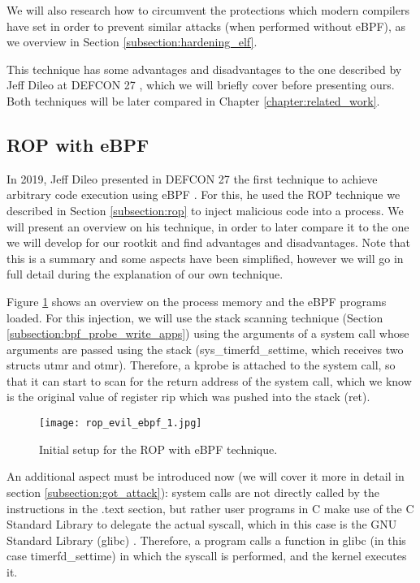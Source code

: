 We will also research how to circumvent the protections which modern compilers have set in order to prevent similar attacks (when performed without eBPF), as we overview in Section \ref{subsection:hardening_elf}.

This technique has some advantages and disadvantages to the one described by Jeff Dileo at DEFCON 27 \cite{evil_ebpf_p6974}, which we will briefly cover before presenting ours. Both techniques will be later compared in Chapter \ref{chapter:related_work}.


\subsection{ROP with eBPF} \label{subsection:rop_ebpf}
In 2019, Jeff Dileo presented in DEFCON 27 the first technique to achieve arbitrary code execution using eBPF \cite{evil_ebpf_p6974}. For this, he used the ROP technique we described in Section \ref{subsection:rop} to inject malicious code into a process. We will present an overview on his technique, in order to later compare it to the one we will develop for our rootkit and find advantages and disadvantages. Note that this is a summary and some aspects have been simplified, however we will go in full detail during the explanation of our own technique.

Figure \ref{fig:rop_evil_ebpf_1} shows an overview on the process memory and the eBPF programs loaded. For this injection, we will use the stack scanning technique (Section \ref{subsection:bpf_probe_write_apps}) using the arguments of a system call whose arguments are passed using the stack (sys\_timerfd\_settime, which receives two structs utmr and otmr). Therefore, a kprobe is attached to the system call, so that it can start to scan for the return address of the system call, which we know is the original value of register rip which was pushed into the stack (ret).

\begin{figure}[htbp]
	\centering
	\texttt{[image: rop\_evil\_ebpf\_1.jpg]}
	\caption{Initial setup for the ROP with eBPF technique.}
	\label{fig:rop_evil_ebpf_1}
\end{figure}

An additional aspect must be introduced now (we will cover it more in detail in section \ref{subsection:got_attack}): system calls are not directly called by the instructions in the .text section, but rather user programs in C make use of the C Standard Library to delegate the actual syscall, which in this case is the GNU Standard Library (glibc) \cite{glibc}. Therefore, a program calls a function in glibc (in this case timerfd\_settime) in which the syscall is performed, and the kernel executes it.

